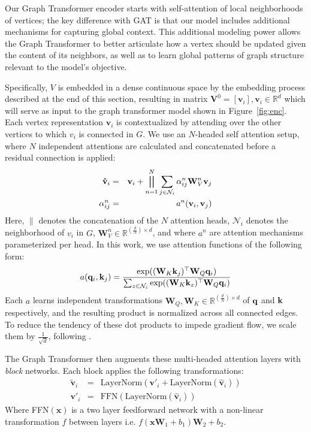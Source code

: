 \documentclass[11pt,a4paper]{article}
\begin{document}
Our Graph Transformer encoder starts with self-attention of local neighborhoods of vertices; the key difference with GAT is that our model includes additional mechanisms for capturing global context. 
This additional modeling power allows the Graph Transformer to better articulate how a vertex should be updated given the content of its neighbors, as well as to learn global patterns of graph structure relevant to the model's objective.

Specifically, $V$ is embedded in a dense continuous space by the embedding process described at the end of this section, resulting in matrix $\mathbf{V}^0=[\mathbf{v}_i], \mathbf{v}_i \in \mathbb{R}^{d}$ which will serve as input to the graph transformer model shown in Figure~\ref{fig:enc}.
Each vertex representation $\mathbf{v}_i$ is contextualized by attending over the other vertices to which $v_i$ is connected in $G$.  
We use an $N$-headed self attention setup, where $N$ independent attentions are calculated and concatenated before a residual connection is applied:
\begin{eqnarray}\label{eq:attn}
    \mathbf{\hat{v}}_i &=& {\bf v}_i + \bigparallel_{n=1}^N \sum_{j \in \mathcal{N}_i}\alpha^n_{ij} \mathbf{W}^n_{V} \mathbf{v}_j \\
     \alpha^n_{ij} &=& a^n({\bf v}_i,{\bf v}_j)
\end{eqnarray}
Here, $\|$ denotes the concatenation of the $N$ attention heads, $\mathcal{N}_i$ denotes the neighborhood of $v_i$ in $G$, $\mathbf{W}^n_{V} \in \mathbb{R}^{(\frac{d}{N})\times d}$, and where $a^n$ are attention mechanisms parameterized per head.
In this work, we use attention functions of the  following form:
\begin{equation}
    a({\bf q}_i,{\bf k}_j) = \frac{\exp(({\mathbf{W}_{K}{\bf k}_j)^{\top}\mathbf{W}_{Q}\mathbf{q}_i})}{\sum_{z \in \mathcal{N}_i}\exp(({\mathbf{W}_{K}{\bf k}_z)^{\top}\mathbf{W}_{Q}\mathbf{q}_i})}
\end{equation}
Each $a$ learns independent transformations $\mathbf{W}_{Q}, \mathbf{W}_{K} \in \mathbb{R}^{(\frac{d}{N})\times d}$ of ${\bf q}$ and ${\bf k}$ respectively, and the resulting product is normalized across all connected edges. 
To reduce the tendency of these dot products to impede gradient flow, we scale them by $\frac{1}{\sqrt{d}}$, following \citet{vaswani2017attention}.

The Graph Transformer then augments these  multi-headed attention layers with {\it block} networks. 
Each block applies the following transformations: 
\begin{eqnarray}
    \mathbf{\tilde{v}}_i &=& \textrm{LayerNorm}(\mathbf{v}'_i + \textrm{LayerNorm}(\mathbf{\hat{v}}_i))\\
    \mathbf{v}'_i &=& \textrm{FFN}(\textrm{LayerNorm}(\mathbf{\hat{v}}_i))
\end{eqnarray}
Where FFN$(\mathbf{x})$ is a two layer feedforward network with a non-linear transformation $f$ between layers i.e. $f( \mathbf{x}\mathbf{W}_1+b_1)\mathbf{W}_2+b_2$. 
\end{document}
